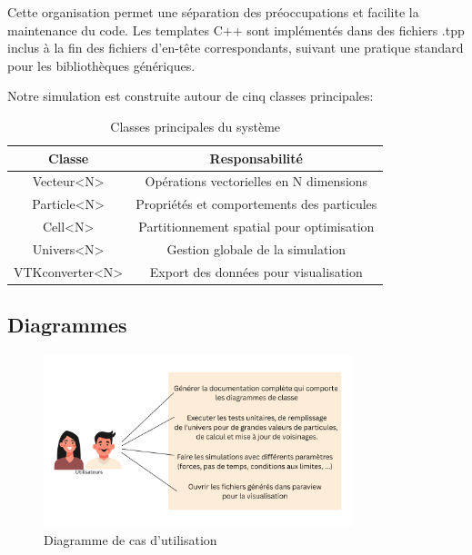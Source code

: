 \documentclass[12pt,a4paper]{article}
\begin{document}
Cette organisation permet une séparation des préoccupations et facilite la maintenance du code. Les templates C++ sont implémentés dans des fichiers .tpp inclus à la fin des fichiers d'en-tête correspondants, suivant une pratique standard pour les bibliothèques génériques.

Notre simulation est construite autour de cinq classes principales:

\begin{table}[H]
\centering
\begin{tabular}{|c|c|}
\hline
\textbf{Classe} & \textbf{Responsabilité} \\
\hline
Vecteur<N> & Opérations vectorielles en N dimensions \\
\hline
Particle<N> & Propriétés et comportements des particules \\
\hline
Cell<N> & Partitionnement spatial pour optimisation \\
\hline
Univers<N> & Gestion globale de la simulation \\
\hline
VTKconverter<N> & Export des données pour visualisation \\
\hline
\end{tabular}
\caption{Classes principales du système}
\end{table}

\subsection{Diagrammes}

\begin{figure}[H]
\centering
\includegraphics[width=0.8\textwidth]{assets/diagrammeCasUtilisation.png}
\caption{Diagramme de cas d'utilisation}
\end{figure}
\end{document}

